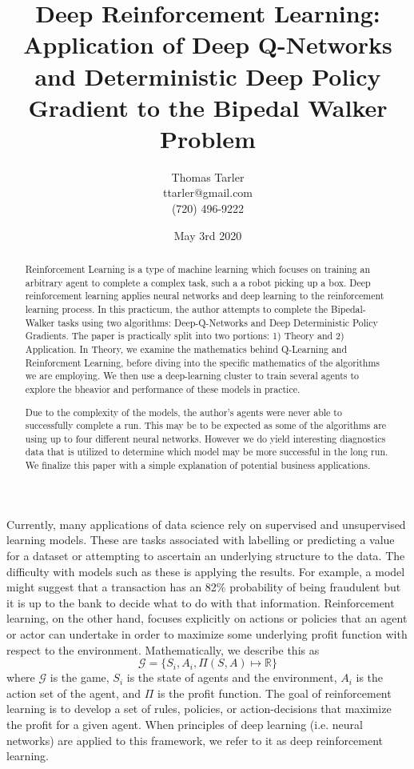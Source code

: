 \documentclass[doc, onecolumn, 12pt]{apa6}
\title{Deep Reinforcement Learning: Application of Deep Q-Networks and Deterministic Deep Policy Gradient to the Bipedal Walker Problem}
\affiliation{Regis University}
\author{Thomas Tarler\\ ttarler@gmail.com \\ (720) 496-9222}
\date{May  3rd 2020}
\begin{document}
\maketitle

\begin{abstract}


Reinforcement Learning is a type of machine learning which focuses on training an arbitrary agent to complete a complex task, such a a robot picking up a box. Deep reinforcement learning applies neural networks and deep learning to the reinforcement learning process. In this practicum, the author attempts to complete the Bipedal-Walker tasks using two algorithms: Deep-Q-Networks and Deep Deterministic Policy Gradients. The paper is practically split into two portions: 1) Theory and 2) Application. In Theory, we examine the mathematics behind Q-Learning and Reinforcment Learning, before diving into the specific mathematics of the algorithms we are employing. We then use a deep-learning cluster to train several agents to explore the bheavior and performance of these models in practice. 

Due to the complexity of the models, the author's agents were never able to successfully complete a run. This may be to be expected as some of the algorithms are using up to four different neural networks. However we do yield interesting diagnostics data that is utilized to determine which model may be more successful in the long run. We finalize this paper with a simple explanation of potential business applications. 


\end{abstract}
\newpage
\tableofcontents
\newpage
\listoffigures
\newpage

Currently, many applications of data science rely on supervised and unsupervised learning models. These are tasks associated with labelling or predicting a value for a dataset or attempting to ascertain an underlying structure to the data. The difficulty with models such as these is applying the results. For example, a model might suggest that a transaction has an 82\% probability of being fraudulent but it is up to the bank to decide what to do with that information. Reinforcement learning, on the other hand, focuses explicitly on actions or policies that an agent or actor can undertake in order to maximize some underlying profit function with respect to the environment. Mathematically, we describe this as \[ \mathcal{G} = \lbrace S_{i}, A_{i}, \Pi(S,A) \mapsto \mathbb{R} \rbrace\] where $\mathcal{G}$ is the game, $S_{i}$ is the state of agents and the environment, $A_{i}$ is the action set of the agent, and $\Pi$ is the profit function. The goal of reinforcement learning is to develop a set of rules, policies, or action-decisions that maximize the profit for a given agent. When principles of deep learning (i.e. neural networks) are applied to this framework, we refer to it as deep reinforcement learning. 
\end{document}
